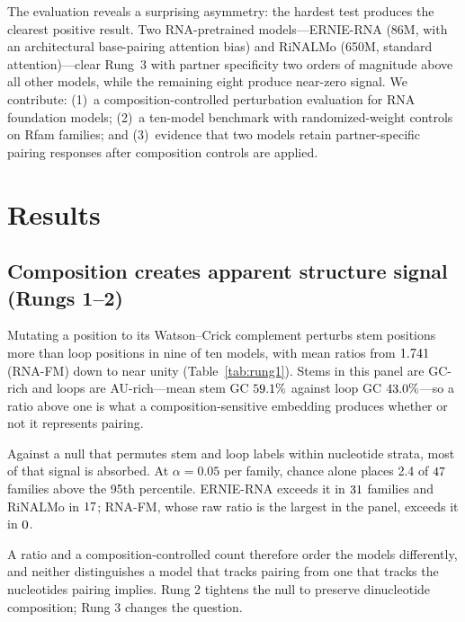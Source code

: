 \documentclass[11pt]{article}
\begin{document}
The evaluation reveals a surprising asymmetry: the hardest test
produces the clearest positive result. Two RNA-pretrained
models---ERNIE-RNA (86M, with an architectural base-pairing attention
bias) and RiNALMo (650M, standard attention)---clear Rung~3 with
partner specificity two orders of magnitude above all other models,
while the remaining eight produce near-zero signal. We contribute:
(1)~a composition-controlled perturbation evaluation for RNA
foundation models; (2)~a ten-model benchmark with randomized-weight
controls on \panelN{} Rfam families; and (3)~evidence that two models
retain partner-specific pairing responses after composition controls are
applied.


\section{Results}

\subsection{Composition creates apparent structure signal (Rungs 1--2)}
\label{sec:composition-results}

Mutating a position to its Watson--Crick complement perturbs stem positions
more than loop positions in nine of ten models, with mean ratios from
$1.741{}$ (RNA-FM) down to near unity (Table~\ref{tab:rung1}). Stems in
this panel are GC-rich and loops are AU-rich---mean stem GC $59.1{}\%$
against loop GC $43.0{}\%$---so a ratio above one is what a
composition-sensitive embedding produces whether or not it represents pairing.

Against a null that permutes stem and loop labels within nucleotide strata, most
of that signal is absorbed. At $\alpha = 0.05$ per family, chance alone places
2.4 of $47{}$ families above the 95th percentile. ERNIE-RNA exceeds it in
$31{}$ families and RiNALMo in $17{}$; RNA-FM, whose
raw ratio is the largest in the panel, exceeds it in $0{}$.

A ratio and a composition-controlled count therefore order the models
differently, and neither distinguishes a model that tracks pairing from one that
tracks the nucleotides pairing implies. Rung 2 tightens the null to preserve
dinucleotide composition; Rung 3 changes the question.
\end{document}
